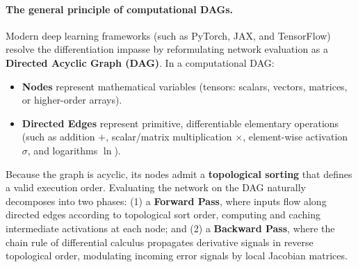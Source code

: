 \paragraph{The general principle of computational DAGs.}
Modern deep learning frameworks (such as PyTorch, JAX, and TensorFlow) resolve the differentiation impasse by reformulating network evaluation as a \textbf{Directed Acyclic Graph (DAG)}. In a computational DAG:
\begin{itemize}[noitemsep,topsep=2pt,parsep=0pt,partopsep=0pt]
  \item \textbf{Nodes} represent mathematical variables (tensors: scalars, vectors, matrices, or higher-order arrays).
  \item \textbf{Directed Edges} represent primitive, differentiable elementary operations (such as addition $+$, scalar/matrix multiplication $\times$, element-wise activation $\sigma$, and logarithms $\ln$).
\end{itemize}
Because the graph is acyclic, its nodes admit a \textbf{topological sorting} that defines a valid execution order. Evaluating the network on the DAG naturally decomposes into two phases: (1) a \textbf{Forward Pass}, where inputs flow along directed edges according to topological sort order, computing and caching intermediate activations at each node; and (2) a \textbf{Backward Pass}, where the chain rule of differential calculus propagates derivative signals in reverse topological order, modulating incoming error signals by local Jacobian matrices.

